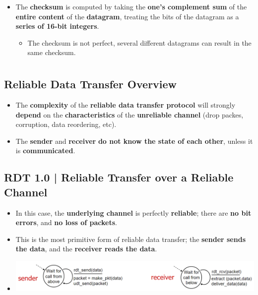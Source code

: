 \documentclass[16pt]{article}
\begin{document}
\begin{itemize}
\begin{enumerate}
        \end{enumerate} 
        \item The \textbf{checksum} is computed by taking the \textbf{one's complement sum} of the \textbf{entire content} of the \textbf{datagram}, treating the bits of the datagram as a \textbf{series of 16-bit integers}.
        \begin{itemize}
            \item The checksum is not perfect, several different datagrams can result in the same checksum.
        \end{itemize}
    \end{itemize}

    \section*{}

    \subsection*{Reliable Data Transfer Overview}
    \begin{itemize}
        \item The \textbf{complexity} of the \textbf{reliable data transfer protocol} will strongly \textbf{depend} on the \textbf{characteristics} of the \textbf{unreliable channel} (drop packes, corruption, data reordering, etc).
        \item The \textbf{sender} and \textbf{receiver} \textbf{do not know the state of each other}, unless it is \textbf{communicated}.
    \end{itemize}

    \subsection*{RDT 1.0 | Reliable Transfer over a Reliable Channel}
    \begin{itemize}
        \item In this case, the \textbf{underlying channel} is perfectly \textbf{reliable}; there are \textbf{no bit errors}, and \textbf{no loss of packets}.
        \item This is the most primitive form of reliable data transfer; the \textbf{sender sends the data}, and the \textbf{receiver reads the data}.
        \item[] \includegraphics*[width=\textwidth - 25pt]{images/RDT-1.0.PNG}
    \end{itemize}
    
\end{document}
